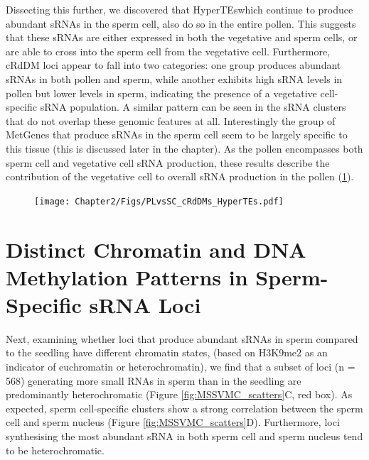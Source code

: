 Dissecting this further, we discovered that HyperTEswhich continue to produce abundant sRNAs in the sperm cell, also do so in the entire pollen.  This suggests that these sRNAs are either expressed in both the vegetative and sperm cells, or are able to cross into the sperm cell from the vegetative cell. Furthermore, cRdDM loci appear to fall into two categories: one group produces abundant sRNAs in both pollen and sperm, while another exhibits high sRNA levels in pollen but lower levels in sperm, indicating the presence of a vegetative cell-specific sRNA population. A similar pattern can be seen in the sRNA clusters that do not overlap these genomic features at all. Interestingly the group of MetGenes that produce sRNAs in the sperm cell seem to be  largely specific to this tissue (this is discussed later in the chapter). As the pollen encompasses both sperm cell and vegetative cell sRNA production, these results describe the contribution of the vegetative cell to overall sRNA production in the pollen (\ref{fig:PLvSC_cRdDMs}).

\begin{figure}[htbp!] 
\centering    
    \texttt{[image: Chapter2/Figs/PLvsSC\_cRdDMs\_HyperTEs.pdf]}
\caption{\textbf{}}
\label{fig:PLvSC_cRdDMs}
\captionsetup{font=small}
    \caption*{}
\end{figure}

\section{Distinct Chromatin and DNA Methylation Patterns in Sperm-Specific sRNA Loci}

Next, examining whether loci that produce abundant sRNAs in sperm compared to the seedling have different chromatin states, (based on H3K9me2 as an indicator of euchromatin or heterochromatin), we find that a subset of loci (n = 568) generating more small RNAs in sperm than in the seedling are predominantly heterochromatic (Figure \ref{fig:MSSVMC_scatters}C, red box). As expected, sperm cell-specific clusters show a strong correlation between the sperm cell and sperm nucleus (Figure \ref{fig:MSSVMC_scatters}D). Furthermore, loci synthesising the most abundant sRNA in both sperm cell and sperm nucleus tend to be heterochromatic.

